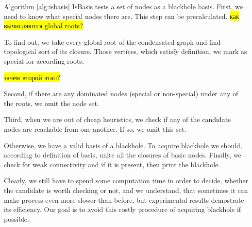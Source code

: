\documentclass{svproc}
\newcommand{\FIXME}[1]{ %
	\colorbox{yellow}{#1}
}
\newcommand{\FIXME}[1]{ %
}
\begin{document}

Algorithm \ref{alg:isbasis} IsBasis tests a set of nodes as a blackhole basis. 
First, we need to know what special nodes there are. This step can be precalculated. 
\FIXME{как вычисляются global roots?}
To find out, we take every global root of the condensated graph and find topological sort of its closure.
Those vertices, which satisfy definition, we mark as special for according roots.

\FIXME{зачем второй этап?}

Second, if there are any dominated nodes (special or non-special) under any of the roots, we omit the node set.

Third, when we are out of cheap heuristics, we check if any of the candidate nodes are reachable from one another. If so, we omit this set. 

 
Otherwise, we have a valid basis of a blackhole.
To acquire blackhole we should, according to definition of basis, unite all the closures of basic nodes.
Finally, we check for weak connectivity and if it is present, then print the blackhole.

Clearly, we still have to spend some computation time in order to decide, whether
the candidate is worth checking or not, and we understand, that sometimes it can make process even more slower than before, but experimental results demostrate its efficiency.
Our goal is to avoid this costly procedure of acquiring blackhole if possible.
\end{document}
